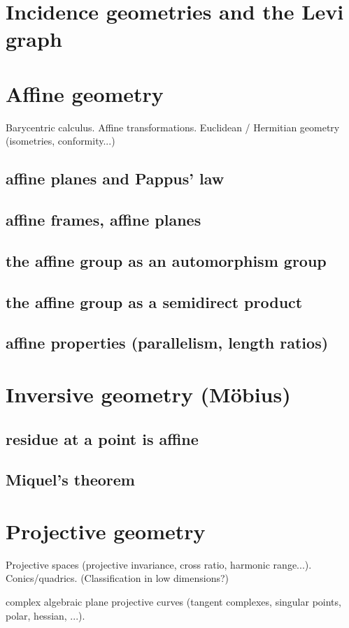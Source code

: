 \section{Incidence geometries and the Levi graph}

\section{Affine geometry}
Barycentric calculus. Affine transformations. Euclidean / Hermitian geometry (isometries, conformity...)
\subsection{affine planes and Pappus' law}
\subsection{affine frames, affine planes}
\subsection{the affine group as an automorphism group}
\subsection{the affine group as a semidirect product}
\subsection{affine properties (parallelism, length ratios)}

\section{Inversive geometry (Möbius)}
\subsection{residue at a point is affine}
\subsection{Miquel's theorem}

\section{Projective geometry}
Projective spaces (projective invariance, cross ratio, harmonic range...). Conics/quadrics. (Classification in low dimensions?)
\par
complex algebraic plane projective curves (tangent complexes, singular points, polar, hessian, ...).
